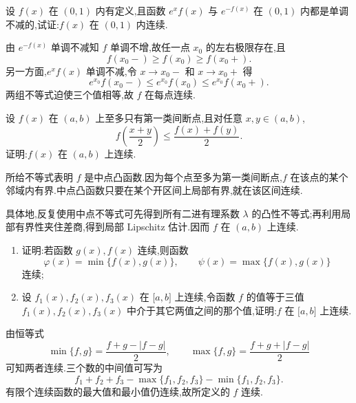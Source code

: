 \begin{example}
    设 $f(x)$ 在 $(0,1)$ 内有定义,且函数 $e^x f(x)$ 与 $e^{-f(x)}$ 在 $(0,1)$ 内都是单调不减的,试证:$f(x)$ 在 $(0,1)$ 内连续.
\end{example}
\exampleblank

\begin{solution}
    由 $e^{-f(x)}$ 单调不减知 $f$ 单调不增,故任一点 $x_0$ 的左右极限存在,且
    \[
        f(x_0-)\geq f(x_0)\geq f(x_0+).
    \]
    另一方面,$e^xf(x)$ 单调不减,令 $x\to x_0-$ 和 $x\to x_0+$ 得
    \[
        e^{x_0}f(x_0-)\leq e^{x_0}f(x_0)\leq e^{x_0}f(x_0+).
    \]
    两组不等式迫使三个值相等,故 $f$ 在每点连续.
\end{solution}

\begin{example}
    设 $f(x)$ 在 $(a,b)$ 上至多只有第一类间断点,且对任意 $x,y\in(a,b)$,
    \[
        f\left(\dfrac{x+y}{2}\right)\leq\dfrac{f(x)+f(y)}{2}.
    \]
    证明:$f(x)$ 在 $(a,b)$ 上连续.
\end{example}
\exampleblank

\begin{solution}
    所给不等式表明 $f$ 是中点凸函数.因为每个点至多为第一类间断点,$f$ 在该点的某个邻域内有界.中点凸函数只要在某个开区间上局部有界,就在该区间连续.

    具体地,反复使用中点不等式可先得到所有二进有理系数 $\lambda$ 的凸性不等式;再利用局部有界性夹住差商,得到局部 Lipschitz 估计.因而 $f$ 在 $(a,b)$ 上连续.
\end{solution}

\begin{example}[\markstar]
    \begin{enumerate}
        \item 证明:若函数 $g(x),f(x)$ 连续,则函数
              \[
                  \varphi(x)=\min\{f(x),g(x)\},
                  \qquad
                  \psi(x)=\max\{f(x),g(x)\}
              \]
              连续;
        \item 设 $f_1(x),f_2(x),f_3(x)$ 在 $\lbrack a,b\rbrack$ 上连续,令函数 $f$ 的值等于三值 $f_1(x),f_2(x),f_3(x)$ 中介于其它两值之间的那个值,证明:$f$ 在 $\lbrack a,b\rbrack$ 上连续.
    \end{enumerate}
\end{example}
\exampleblank

\begin{solution}
    由恒等式
    \[
        \min\{f,g\}=\dfrac{f+g-|f-g|}{2},\qquad
        \max\{f,g\}=\dfrac{f+g+|f-g|}{2}
    \]
    可知两者连续.三个数的中间值可写为
    \[
        f_1+f_2+f_3-\max\{f_1,f_2,f_3\}-\min\{f_1,f_2,f_3\}.
    \]
    有限个连续函数的最大值和最小值仍连续,故所定义的 $f$ 连续.
\end{solution}


